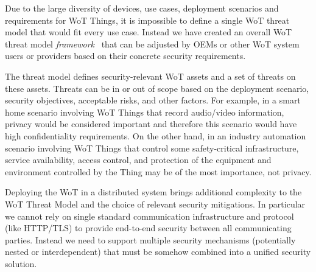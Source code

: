 Due to the large diversity of devices,
use cases,
deployment scenarios 
and requirements for WoT Things,
it is impossible to define a single WoT threat model
that would fit every use case.
Instead we have created an overall WoT threat model
\emph{framework}~\cite{Wot2017sec} 
that can be adjusted by OEMs or other WoT system users or providers
based on their concrete security requirements.


The threat model defines security-relevant WoT assets 
and a set of threats on these assets.
Threats can be in or out of scope based on the deployment scenario,
security objectives, acceptable risks, and other factors.
For example,
in a smart home scenario involving WoT Things that record audio/video
information, privacy would be considered important and 
therefore this scenario would have high confidentiality requirements.
On the other hand,
in an industry automation scenario involving WoT Things that 
control some safety-critical infrastructure,
service availability, access control,
and protection of the equipment and environment controlled by the Thing 
may be of the most importance, not privacy.

Deploying the WoT in a distributed system brings additional complexity 
to the WoT Threat Model and the choice of relevant security mitigations.
In particular we cannot rely on single standard communication infrastructure 
and protocol 
(like HTTP/TLS) to provide end-to-end security between all communicating
parties.
Instead we need to support multiple security mechanisms 
(potentially nested or interdependent) 
that must be somehow combined into a unified security solution.  
 
